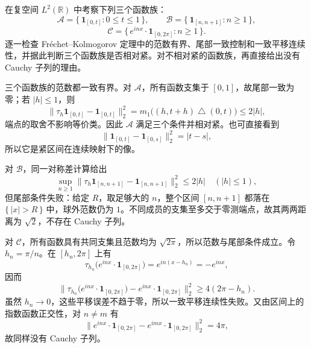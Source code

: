 \begin{exercise}\label{b1:ex:25-fk-model-families}
在复空间 \(L^2(\mathbb R)\) 中考察下列三个函数族：
\[
 \mathcal A=\{\,\mathbf1_{[0,t]}:0\le t\le1\,\},\qquad
 \mathcal B=\{\,\mathbf1_{[n,n+1]}:n\ge1\,\},
\]
\[
 \mathcal C=\{\,e^{inx}\cdot\mathbf1_{[0,2\pi]}:n\ge1\,\}.
\]
逐一检查 Fréchet–Kolmogorov 定理中的范数有界、尾部一致控制和一致平移连续性，并据此判断三个函数族是否相对紧。对不相对紧的函数族，再直接给出没有 Cauchy 子列的理由。
\end{exercise}
\begin{solution}
三个函数族的范数都一致有界。对 \(\mathcal A\)，所有函数支集于 \([0,1]\)，故尾部一致为零；若 \(|h|\le1\)，则
\[
 \|\tau_h\mathbf1_{[0,t]}-\mathbf1_{[0,t]}\|_2^2
 =m_1\bigl((h,t+h)\mathbin{\triangle}(0,t)\bigr)
 \le2|h|,
\]
端点的取舍不影响等价类。因此 \(\mathcal A\) 满足三个条件并相对紧。也可直接看到
\[
 \|\mathbf1_{[0,t]}-\mathbf1_{[0,s]}\|_2^2=|t-s|,
\]
所以它是紧区间在连续映射下的像。

对 \(\mathcal B\)，同一对称差计算给出
\[
 \sup_{n\ge1}\|\tau_h\mathbf1_{[n,n+1]}-
                    \mathbf1_{[n,n+1]}\|_2^2\le2|h|
 \quad(|h|\le1),
\]
但尾部条件失败：给定 \(R\)，取足够大的 \(n\)，整个区间 \([n,n+1]\) 都落在 \(\{\,|x|>R\,\}\) 中，球外范数仍为 \(1\)。不同成员的支集至多交于零测端点，故其两两距离为 \(\sqrt2\)，不存在 Cauchy 子列。

对 \(\mathcal C\)，所有函数具有共同支集且范数均为 \(\sqrt{2\pi}\)，所以范数与尾部条件成立。令 \(h_n=\pi/n\)。在 \([h_n,2\pi]\) 上有
\[
 \tau_{h_n}\bigl(e^{inx}\cdot\mathbf1_{[0,2\pi]}\bigr)
 =e^{in(x-h_n)}=-e^{inx},
\]
因而
\[
 \bigl\|\tau_{h_n}\bigl(e^{inx}\cdot\mathbf1_{[0,2\pi]}\bigr)
       -e^{inx}\cdot\mathbf1_{[0,2\pi]}\bigr\|_2^2
 \ge4(2\pi-h_n).
\]
虽然 \(h_n\to0\)，这些平移误差不趋于零，所以一致平移连续性失败。又由区间上的指数函数正交性，对 \(n\ne m\) 有
\[
 \|e^{inx}\cdot\mathbf1_{[0,2\pi]}-
       e^{imx}\cdot\mathbf1_{[0,2\pi]}\|_2^2=4\pi,
\]
故同样没有 Cauchy 子列。
\end{solution}

